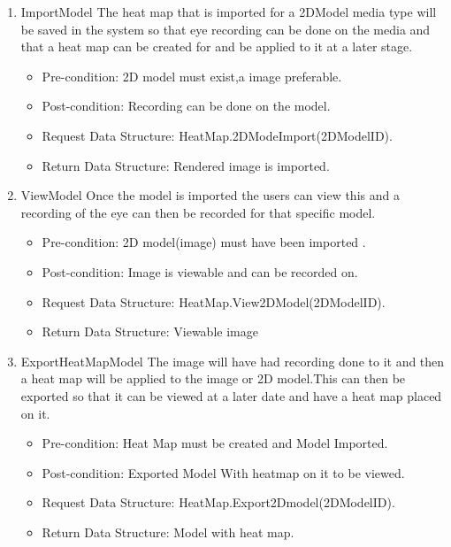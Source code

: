 		\begin{enumerate}
\item{ImportModel}
\newline
The heat map that is imported for a 2DModel media type will be saved in the system so that eye recording can be done on the media and that a heat map can be created for and be applied to it at a later stage.
\begin{itemize}
\item Pre-condition: 2D model must exist,a image preferable.
\item Post-condition: Recording can be done on the model.
\item Request Data Structure: HeatMap.2DModeImport(2DModelID).
\item Return Data Structure: Rendered image is imported.
\end{itemize}

\item{ViewModel}
Once the model is imported the users can view this and a recording of the eye can then be recorded for that specific model.
\begin{itemize}
\item Pre-condition: 2D model(image) must have been imported .
\item Post-condition: Image is viewable and can be recorded on.
\item Request Data Structure: HeatMap.View2DModel(2DModelID).
\item Return Data Structure: Viewable image
\end{itemize}

\item{ExportHeatMapModel}
The image will have had recording done to it and then a heat map will be applied to the image or 2D model.This can then be exported so that it can be viewed at a later date and have a heat map placed on it. 
\begin{itemize}
\item Pre-condition: Heat Map must be created and Model Imported.
\item Post-condition: Exported Model With heatmap on it to be viewed.
\item Request Data Structure: HeatMap.Export2Dmodel(2DModelID).
\item Return Data Structure: Model with heat map.
\end{itemize}

\end{enumerate}
		
		

